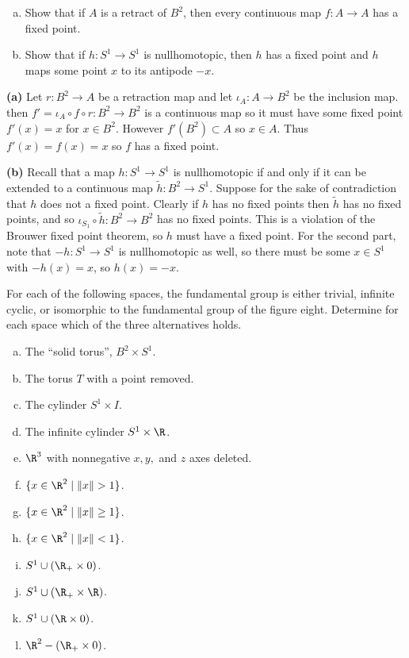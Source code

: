 \documentclass[11pt,letterpaper]{article}
\begin{document}
\begin{problem}\noindent
    \begin{enumerate}[(a)]
        \item Show that if $A$ is a retract of $B^2$, then every continuous map $f : A \to A$ has a fixed point.
        \item Show that if $h : S^1 \to S^1$ is nullhomotopic, then $h$ has a fixed point and $h$ maps some point $x$ to its antipode $-x$. 
    \end{enumerate}
\end{problem}

\begin{solution}
    \textbf{(a)} Let $r : B^2 \to A$ be a retraction map and let $\iota_A : A \to B^2$ be the inclusion map. then $f'=\iota_A \circ f \circ r : B^2 \to B^2$ is a continuous map so it must have some fixed point $f'(x)=x$ for $x\in B^2$. However $f'(B^2)\subset A$ so $x\in A$. Thus $f'(x)=f(x)=x$ so $f$ has a fixed point. 

    \textbf{(b)} Recall that a map $h : S^1 \to S^1$ is nullhomotopic if and only if it can be extended to a continuous map $\widetilde{h} : B^2 \to S^1$. Suppose for the sake of contradiction that $h$ does not a fixed point. Clearly if $h$ has no fixed points then $\widetilde{h}$ has no fixed points, and so $\iota_{S_1}\circ \widetilde{h} : B^2 \to B^2$ has no fixed points. This is a violation of the Brouwer fixed point theorem, so $h$ must have a fixed point. For the second part, note that $-h : S^1 \to S^1$ is nullhomotopic as well, so there must be some $x\in S^1$ with $-h(x)=x$, so $h(x)=-x$.
\end{solution}

\begin{problem}
    For each of the following spaces, the fundamental group is either trivial, infinite cyclic, or isomorphic to the fundamental group of the figure eight. Determine for each space which of the three alternatives holds.
    \begin{enumerate}[(a)]
        \item The ``solid torus'', $B^2\times S^1$.
        \item The torus $T$ with a point removed.
        \item The cylinder $S^1\times I$.
        \item The infinite cylinder $S^1\times \R$.
        \item $\R^3$ with nonnegative $x,y,$ and $z$ axes deleted.
        \item $\{x\in \R^2\mid \|x\|>1\}$.
        \item $\{x\in \R^2\mid \|x\|\geq 1\}$.
        \item $\{x\in \R^2\mid \|x\|<1\}$.
        \item $S^1\cup (\R_+\times 0)$.
        \item $S^1\cup (\R_+\times \R)$.
        \item $S^1\cup (\R\times 0)$.
        \item $\R^2-(\R_+\times 0)$.
    \end{enumerate}
\end{problem}
\end{document}

